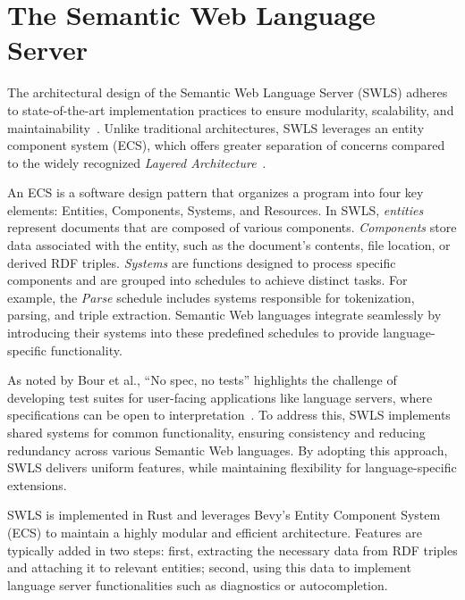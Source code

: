 \section{The Semantic Web Language Server}%
\label{sec:semantic_lsp}

The architectural design of the Semantic Web Language Server (SWLS) adheres to state-of-the-art implementation practices to ensure modularity, scalability, and maintainability~\cite{10.1145/3550355.3552452,10.1145/3563834.3567537,10.1145/3550355.3552452,Bour_2018}.
Unlike traditional architectures, SWLS leverages an entity component system (ECS), which offers greater separation of concerns compared to the widely recognized \textit{Layered Architecture}~\cite{10.1145/3550355.3552452}.

An ECS is a software design pattern that organizes a program into four key elements: Entities, Components, Systems, and Resources. 
In SWLS, \textit{entities} represent documents that are composed of various components. 
\textit{Components} store data associated with the entity, such as the document's contents, file location, or derived RDF triples. 
\textit{Systems} are functions designed to process specific components and are grouped into schedules to achieve distinct tasks. 
For example, the \textit{Parse} schedule includes systems responsible for tokenization, parsing, and triple extraction.
Semantic Web languages integrate seamlessly by introducing their systems into these predefined schedules to provide language-specific functionality.

As noted by Bour et al., ``No spec, no tests'' highlights the challenge of developing test suites for user-facing applications like language servers, where specifications can be open to interpretation~\cite{Bour_2018}. 
To address this, SWLS implements shared systems for common functionality, ensuring consistency and reducing redundancy across various Semantic Web languages.
By adopting this approach, SWLS delivers uniform features, while maintaining flexibility for language-specific extensions.

SWLS is implemented in Rust and leverages Bevy’s Entity Component System (ECS) to maintain a highly modular and efficient architecture.
Features are typically added in two steps:
  first, extracting the necessary data from RDF triples and attaching it to relevant entities; 
  second, using this data to implement language server functionalities such as diagnostics or autocompletion.

